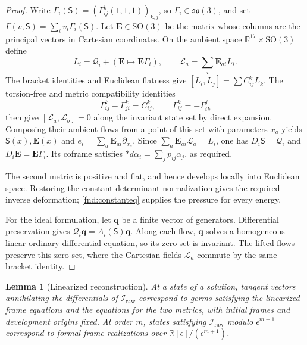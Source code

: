 \documentclass[11pt,a4paper]{article}
\numberwithin{equation}{section}
\theoremstyle{plain}
\newtheorem{lemma}[theorem]{Lemma}
\theoremstyle{definition}
\theoremstyle{remark}
\begin{document}
\begin{proof}
Write $\Gamma_i(\mathsf S)=(\Gamma^k_{ij}(1,1,1))_{k,j}$, so $\Gamma_i\in\mathfrak{so}(3)$, and set $\Gamma(v,\mathsf S)=\sum_i v_i\Gamma_i(\mathsf S)$. Let $\mathbf E\in\mathrm{SO}(3)$ be the matrix whose columns are the principal vectors in Cartesian coordinates. On the ambient space $\mathbb R^{17}\times\mathrm{SO}(3)$ define
\[
L_i=\mathcal Q_i+(\mathbf E\mapsto\mathbf E\Gamma_i),\qquad \mathcal L_a=\sum_i\mathbf E_{ai}L_i.
\]
The bracket identities and Euclidean flatness give $[L_i,L_j]=\sum C^k_{ij}L_k$. The torsion-free and metric compatibility identities
\[
\Gamma^k_{ij}-\Gamma^k_{ji}=C^k_{ij},\qquad
\Gamma^k_{ij}=-\Gamma^j_{ik}
\]
then give $[\mathcal L_a,\mathcal L_b]=0$ along the invariant state set by direct expansion. Composing their ambient flows from a point of this set with parameters $x_a$ yields $\mathsf S(x),\mathbf E(x)$ and $e_i=\sum_a\mathbf E_{ai}\partial_{x_a}$. Since $\sum_a\mathbf E_{ai}\mathcal L_a=L_i$, one has $D_i\mathsf S=\mathcal Q_i$ and $D_i\mathbf E=\mathbf E\Gamma_i$. Its coframe satisfies $*d\alpha_i=\sum_jp_{ij}\alpha_j$, as required.

The second metric is positive and flat, and hence develops locally into Euclidean space. Restoring the constant determinant normalization gives the required inverse deformation; \eqref{fnd:constanteq} supplies the pressure for every energy.

For the ideal formulation, let $\mathbf q$ be a finite vector of generators.
Differential preservation gives $\mathcal Q_i\mathbf q=A_i(\mathsf S)\mathbf q$.
Along each flow, $\mathbf q$ solves a homogeneous linear ordinary
differential equation, so its zero set is invariant. The lifted flows
preserve this zero set, where the Cartesian fields $\mathcal L_a$ commute
by the same bracket identity.
\end{proof}
\begin{lemma}[Linearized reconstruction]
\label{fnd:linearized-reconstruction}
At a state of a solution, tangent vectors annihilating the differentials
of $\mathscr I_{\mathrm{raw}}$ correspond to germs satisfying the
linearized frame equations and the equations for the two metrics, with
initial frames and development origins fixed. At order $m$, states
satisfying $\mathscr I_{\mathrm{raw}}$ modulo $\epsilon^{m+1}$ correspond
to formal frame realizations over $\mathbb R[\epsilon]/(\epsilon^{m+1})$.
\end{lemma}
\end{document}

